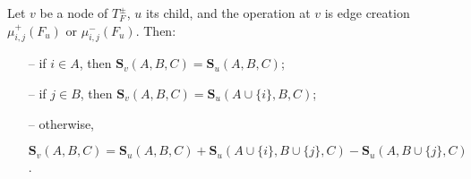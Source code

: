 \begin{lemma}
	Let $v$ be a node of $T^{\pm}_F$, $u$ its child, and the operation at $v$ is edge creation $\mu^+_{i,j}(F_u)$ or $\mu^-_{i,j}(F_u)$.
	Then:
	\begin{itemize}
		\item[--] if $i \in A$, then $\mathbf{S}_v(A,B,C) = \mathbf{S}_u(A,B,C)$;
		\item[--] if $j \in B$, then $\mathbf{S}_v(A,B,C) = \mathbf{S}_u(A \cup \{i\},B,C)$;
		\item[--] otherwise, \vspace{-4pt}
		
		$\mathbf{S}_v(A,B,C) = \mathbf{S}_u(A,B,C) + \mathbf{S}_u(A \cup \{i\},B \cup \{j\},C) - \mathbf{S}_u(A,B \cup \{j\},C)$.
	\end{itemize}
\end{lemma}
\fi

